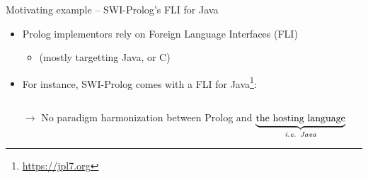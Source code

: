 \documentclass[presentation]{beamer}
\begin{document}
\begin{frame}{Motivating example -- SWI-Prolog's FLI for Java}

    \begin{itemize}
        \item Prolog  implementors rely on Foreign Language Interfaces (FLI) 
        \begin{itemize}
            \item (mostly targetting Java, or C)
        \end{itemize}

        \vfill

        \item For instance, SWI-Prolog comes with a FLI for Java\footnote{\url{https://jpl7.org}}:
        \inputminted{java}{code/SwiFliExample.java}

        \vfill

        \item[$\rightarrow$] No paradigm harmonization between Prolog and $\underbrace{\text{the hosting language}}_\text{\itshape i.e. Java}$
    \end{itemize}

\end{frame}
\end{document}
